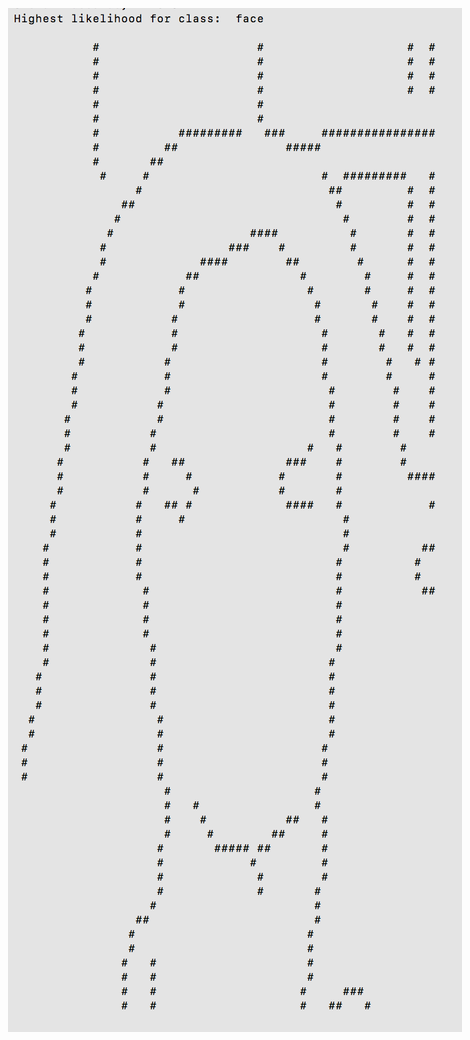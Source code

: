 \documentclass[11pt]{article}
\begin{document}
\begin{center}
\includegraphics[scale=0.6]{part1/extra/high_face.png}
\end{center}
\end{document}

